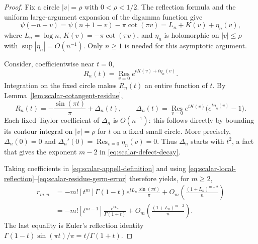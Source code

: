 \begin{proof}
Fix a circle $|v|=\rho$ with $0<\rho<1/2$.  The reflection formula
and the uniform large-argument expansion of the digamma function give
\begin{equation}
 \psi(-n+v)=\psi(n+1-v)-\pi\cot(\pi v)
           =L_n+K(v)+\eta_n(v),
 \label{eq:scalar-local-reflection}
\end{equation}
where $L_n=\log n$, $K(v)=-\pi\cot(\pi v)$, and
$\eta_n$ is holomorphic on $|v|\leq\rho$ with
$\sup|\eta_n|=O(n^{-1})$.  Only $n\geq1$ is needed for this
asymptotic argument.

Consider, coefficientwise near $t=0$,
\begin{equation}
 R_n(t)=\operatorname*{Res}_{v=0}e^{tK(v)+t\eta_n(v)}.
 \label{eq:scalar-residue-germ}
\end{equation}
Integration on the fixed circle makes $R_n(t)$ an entire function
of $t$.  By Lemma~\ref{lem:scalar-cotangent-residue},
\begin{equation}
 R_n(t)=-\frac{\sin(\pi t)}{\pi}+\Delta_n(t),
 \qquad
 \Delta_n(t)=\operatorname*{Res}_{v=0}
       e^{tK(v)}\bigl(e^{t\eta_n(v)}-1\bigr).
 \label{eq:scalar-residue-germ-error}
\end{equation}
Each fixed Taylor coefficient of $\Delta_n$ is $O(n^{-1})$:
this follows directly by bounding its contour integral on
$|v|=\rho$ for $t$ on a fixed small circle.  More precisely,
$\Delta_n(0)=0$ and
$\Delta_n'(0)=\operatorname*{Res}_{v=0}\eta_n(v)=0$.
Thus $\Delta_n$ starts with $t^2$, a fact that gives the exponent
$m-2$ in \eqref{eq:scalar-defect-decay}.

Taking coefficients in
\eqref{eq:scalar-appell-definition} and using
\eqref{eq:scalar-local-reflection}--\eqref{eq:scalar-residue-germ-error}
therefore yields, for $m\geq2$,
\begin{equation}
 \begin{aligned}
 r_{m,n}
 &=-m![t^m]\Gamma(1-t)e^{tL_n}
                         \frac{\sin(\pi t)}{\pi}
       +O_m\!\left(\frac{(1+L_n)^{m-2}}{n}\right)\\
 &=-m![t^{m-1}]\frac{e^{tL_n}}{\Gamma(1+t)}
       +O_m\!\left(\frac{(1+L_n)^{m-2}}{n}\right).
 \end{aligned}
 \label{eq:scalar-nondecaying-polynomial}
\end{equation}
The last equality is Euler's reflection identity
$\Gamma(1-t)\sin(\pi t)/\pi=t/\Gamma(1+t)$.


\end{proof}
